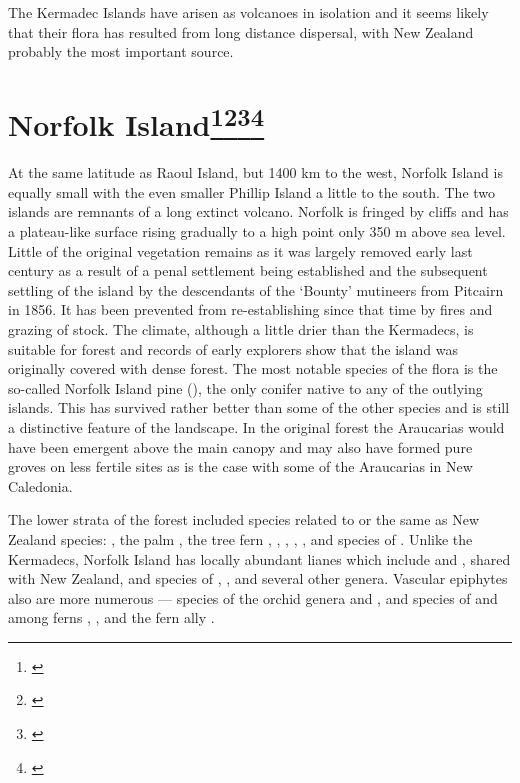 The Kermadec Islands have arisen as volcanoes in isolation and it seems likely that their flora has resulted from long distance dispersal, with New Zealand probably the most important source.

\section[Norfolk Island]{Norfolk Island\footnote{\cite{laing1915revised}}\footnote{\cite{turner1968conservation}}\footnote{\cite{green1970notes}}\footnote{\cite{green1979observations}}}

At the same latitude as Raoul Island, but 1400 km to the west, Norfolk Island is equally small with the even smaller Phillip Island a little to the south.
The two islands are remnants of a long extinct volcano.
Norfolk is fringed by cliffs and has a plateau-like surface rising gradually to a high point only 350 m above sea level.
Little of the original vegetation remains as it was largely removed early last century as a result of a penal settlement being established and the subsequent settling of the island by the descendants of the `Bounty' mutineers from Pitcairn in 1856.
It has been prevented from re-establishing since that time by fires and grazing of stock.
The climate, although a little drier than the Kermadecs, is suitable for forest and records of early explorers show that the island was originally covered with dense forest.
The most notable species of the flora is the so-called Norfolk Island pine (), the only conifer native to any of the outlying islands.
This has survived rather better than some of the other species and is still a distinctive feature of the landscape.
In the original forest the Araucarias would have been emergent above the main canopy and may also have formed pure groves on less fertile sites as is the case with some of the Araucarias in New Caledonia.

The lower strata of the forest included species related to or the same as New Zealand species: , the palm , the tree fern , , , , ,  and species of .
Unlike the Kermadecs, Norfolk Island has locally abundant lianes which include  and , shared with New Zealand, and species of , ,  and several other genera.
Vascular epiphytes also are more numerous --- species of the orchid genera  and , and species of  and among ferns , ,  and the fern ally .

